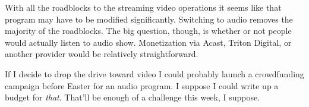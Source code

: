 With all the roadblocks to the streaming video operations it seems like
that program may have to be modified significantly. Switching to audio
removes the majority of the roadblocks. The big question, though, is
whether or not people would actually listen to audio show. Monetization
via Acast, Triton Digital, or another provider would be relatively
straightforward.

If I decide to drop the drive toward video I could probably launch a
crowdfunding campaign before Easter for an audio program. I suppose I
could write up a budget for \emph{that}. That'll be enough of a
challenge this week, I suppose.
